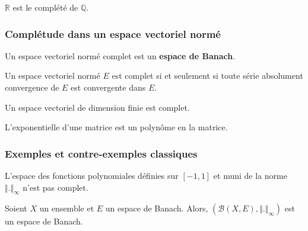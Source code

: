   \begin{example}
    $\mathbb{R}$ est le complété de $\mathbb{Q}$.
  \end{example}

  \subsubsection{Complétude dans un espace vectoriel normé}


  \begin{definition}
    Un espace vectoriel normé complet est un \textbf{espace de Banach}.
  \end{definition}


  \begin{proposition}
    Un espace vectoriel normé $E$ est complet si et seulement si toute série absolument convergence de $E$ est convergente dans $E$.
  \end{proposition}

  \begin{proposition}
    Un espace vectoriel de dimension finie est complet.
  \end{proposition}


  \begin{application}
    L'exponentielle d'une matrice est un polynôme en la matrice.
  \end{application}

  \subsubsection{Exemples et contre-exemples classiques}


  \begin{cexample}
    L'espace des fonctions polynomiales définies sur $[-1,1]$ et muni de la norme $\Vert . \Vert_{\infty}$ n'est pas complet.
  \end{cexample}


  \begin{example}
    Soient $X$ un ensemble et $E$ un espace de Banach. Alors, $(\mathcal{B}(X,E), \Vert . \Vert_\infty)$ est un espace de Banach.
  \end{example}


